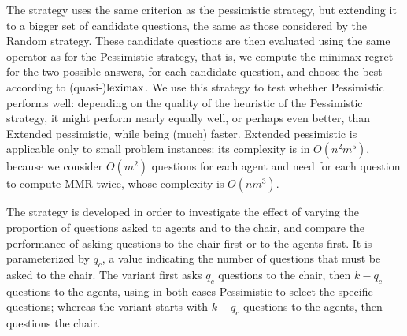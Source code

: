 \documentclass[sigconf, anonymous]{aamas}
\begin{document}
The  strategy uses the same criterion as the pessimistic strategy, but extending it to a bigger set of candidate questions, the same as those considered by the Random strategy.
These candidate questions are then evaluated using the same operator as for the Pessimistic strategy, that is, we compute the minimax regret for the two possible answers, for each candidate question, and choose the best according to (quasi-)$\operatorname{leximax}$.
We use this strategy to test whether Pessimistic performs well: depending on the quality of the heuristic of the Pessimistic strategy, it might perform nearly equally well, or perhaps even better, than Extended pessimistic, while being (much) faster. Extended pessimistic is applicable only to small problem instances: its complexity is in $O(n^2 m^5)$, because we consider $O(m^2)$ questions for each agent and need for each question to compute MMR twice, whose complexity is $O(nm^3)$.

The  strategy is developed in order to investigate the effect of varying the proportion of questions asked to agents and to the chair, and compare the performance of asking questions to the chair first or to the agents first. It is parameterized by $q_c$, a value indicating the number of questions that must be asked to the chair.
The  variant first asks $q_c$ questions to the chair, then $k - q_c$ questions to the agents, using in both cases Pessimistic to select the specific questions; whereas the  variant starts with $k - q_c$ questions to the agents, then questions the chair. 
\end{document}
